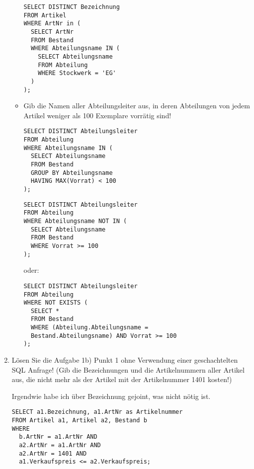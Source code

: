 \documentclass{lehramt-informatik-aufgabe}
\begin{document}
\begin{enumerate}
\begin{itemize}
\begin{antwort}[muster]
\begin{verbatim}
SELECT DISTINCT Bezeichnung
FROM Artikel
WHERE ArtNr in (
  SELECT ArtNr
  FROM Bestand
  WHERE Abteilungsname IN (
    SELECT Abteilungsname
    FROM Abteilung
    WHERE Stockwerk = 'EG'
  )
);
\end{verbatim}
\end{antwort}


\item Gib die Namen aller Abteilungsleiter aus, in deren Abteilungen von
jedem Artikel weniger als 100 Exemplare vorrätig sind!

\begin{antwort}[richtig]
\begin{verbatim}
SELECT DISTINCT Abteilungsleiter
FROM Abteilung
WHERE Abteilungsname IN (
  SELECT Abteilungsname
  FROM Bestand
  GROUP BY Abteilungsname
  HAVING MAX(Vorrat) < 100
);
\end{verbatim}
\end{antwort}

\begin{antwort}[richtig]
\begin{verbatim}
SELECT DISTINCT Abteilungsleiter
FROM Abteilung
WHERE Abteilungsname NOT IN (
  SELECT Abteilungsname
  FROM Bestand
  WHERE Vorrat >= 100
);
\end{verbatim}
\end{antwort}

oder:

\begin{antwort}[muster]
\begin{verbatim}
SELECT DISTINCT Abteilungsleiter
FROM Abteilung
WHERE NOT EXISTS (
  SELECT *
  FROM Bestand
  WHERE (Abteilung.Abteilungsname =
  Bestand.Abteilungsname) AND Vorrat >= 100
);
\end{verbatim}
\end{antwort}
\end{itemize}


\item Lösen Sie die Aufgabe 1b) Punkt 1 ohne Verwendung einer
geschachtelten SQL Anfrage! (Gib die Bezeichnungen und die
Artikelnummern aller Artikel aus, die nicht mehr als der Artikel mit der
Artikelnummer 1401 kosten!)
\begin{antwort}[falsch]
Irgendwie habe ich über Bezeichnung gejoint, was nicht nötig ist.
\begin{verbatim}
SELECT a1.Bezeichnung, a1.ArtNr as Artikelnummer
FROM Artikel a1, Artikel a2, Bestand b
WHERE
  b.ArtNr = a1.ArtNr AND
  a2.ArtNr = a1.ArtNr AND
  a2.ArtNr = 1401 AND
  a1.Verkaufspreis <= a2.Verkaufspreis;
\end{verbatim}
\end{antwort}


\end{enumerate}
\end{document}
